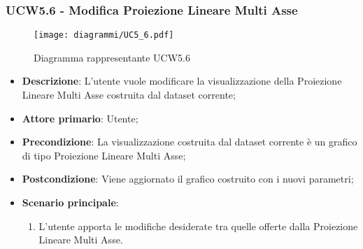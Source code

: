 \newpage
\subsubsection{UCW5.6 - Modifica Proiezione Lineare Multi Asse}
\label{ssub:ucw5.6}
\begin{figure}[h]
    \centering
    \texttt{[image: diagrammi/UC5\_6.pdf]}
    \caption{Diagramma rappresentante UCW5.6}
    \label{fig:UCW5.6}
\end{figure}

\begin{itemize}
    \item \textbf{Descrizione}: L’utente vuole modificare la visualizzazione della Proiezione Lineare Multi Asse
          costruita dal dataset corrente;

    \item \textbf{Attore primario}: Utente;

    \item \textbf{Precondizione}:   La visualizzazione costruita dal dataset corrente è un grafico di tipo Proiezione Lineare Multi Asse;
    \item \textbf{Postcondizione}:  Viene aggiornato il grafico costruito con i nuovi parametri;

    \item \textbf{Scenario principale}:
          \begin{enumerate}
              \item L'utente apporta le modifiche desiderate tra quelle offerte dalla Proiezione Lineare Multi Asse.
          \end{enumerate}
\end{itemize}

